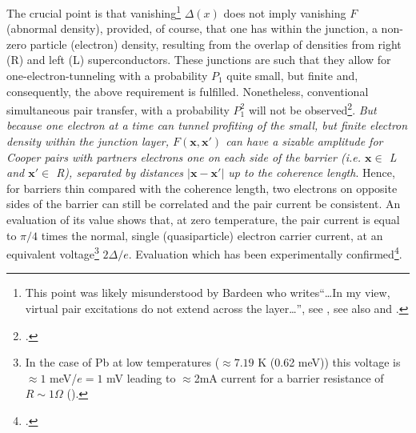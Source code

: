 The crucial point is that vanishing\footnote{This point was likely misunderstood by Bardeen who writes``\dots In my view, virtual pair excitations do not extend across the layer\dots'', see \cite{McDonald:01}, see also \cite{Bardeen:61} and \cite{Bardeen:62}.} $\Delta(x)$ does not imply vanishing $F$ (abnormal density), provided, of course, that one has within the junction, a non-zero particle (electron) density, resulting from the overlap of densities from right (R) and left (L) superconductors. These junctions are such that they allow for one-electron-tunneling with a probability $P_1$ quite small, but finite  and, consequently, the above requirement is fulfilled. Nonetheless, conventional  simultaneous pair transfer, with a probability $P_1^2$ will not be observed\footnote{\cite{Pippard:12}.}. \textit{But because one electron at a time can tunnel profiting of the small, but finite electron density within the junction layer,   $F(\mathbf{x},\mathbf{x}')$ can have a sizable amplitude for Cooper pairs with partners electrons one on each side of the barrier (i.e. $\mathbf x\in$ L and $\mathbf x'\in$ R), separated by distances $|\mathbf{x}-\mathbf{x}'|$ up to the coherence length}. Hence, for barriers  thin compared with the coherence length, two electrons on opposite sides of the barrier can still be correlated and the pair current   be consistent. An evaluation of its 
value shows that, at zero temperature, the pair current is equal to $\pi/4$ times the normal, single (quasiparticle) electron carrier current, at an equivalent voltage\footnote{In the case of Pb at low temperatures ($\approx7.19$ K (0.62 meV)) this voltage is $\approx 1$ meV/$e=1$ mV leading to $\approx$2mA current for a barrier resistance of $R\sim1\Omega$ (\cite{Ambegaokar:63,McDonald:01,Tinkham:96}).} $2\Delta/e$.
Evaluation which has been experimentally confirmed\footnote{\cite{Rogalla:12}.}.


